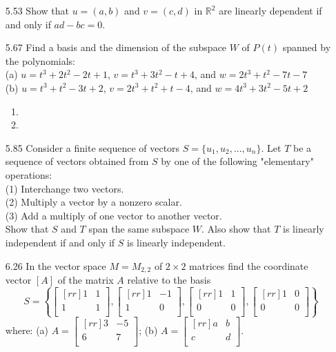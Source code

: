 \documentclass[12pt]{article}
\theoremstyle{definition}
\theoremstyle{plain}
\begin{document}
\begin{enumerate}
\begin{enumerate}
	\end{enumerate}
\item[5.53]Show that $u=(a,b)$ and $v=(c,d)$ in $\mathbb{R}^2$ are linearly dependent if and only if $ad-bc=0$.
\item[5.67]Find a basis and the dimension of the subspace $W$ of $P(t)$ spanned by the polynomials:\\
(a) $u=t^3+2t^2-2t+1$, $v=t^3+3t^2-t+4$, and $w=2t^3+t^2-7t-7$\\
(b) $u=t^3+t^2-3t+2$, $v=2t^3+t^2+t-4$, and $w=4t^3+3t^2-5t+2$
	\begin{enumerate}
	\item
	\item
	\end{enumerate}
\item[5.85]Consider a finite sequence of vectors $S=\{u_1,u_2,...,u_n\}$. Let $T$ be a sequence of vectors obtained from $S$ by one of the following "elementary" operations:\\
(1) Interchange two vectors.\\
(2) Multiply a vector by a nonzero scalar.\\
(3) Add a multiply of one vector to another vector.\\
Show that $S$ and $T$ span the same subspace $W$. Also show that $T$ is linearly independent if and only if $S$ is linearly independent.
\item[6.26]In the vector space $M=M_{2,2}$ of $2\times 2$ matrices find the coordinate vector $[A]$ of the matrix $A$ relative to the basis
\[ S=\left\{ \begin{bmatrix}[rr]1&1\\1&1\\\end{bmatrix},\begin{bmatrix}[rr]1&-1\\1&0\\\end{bmatrix},\begin{bmatrix}[rr]1&1\\0&0\\\end{bmatrix},\begin{bmatrix}[rr]1&0\\0&0\\\end{bmatrix}\right\} \]
where: (a) $A=\begin{bmatrix}[rr]3&-5\\6&7\\\end{bmatrix}$; (b) $A=\begin{bmatrix}[rr]a&b\\c&d\\\end{bmatrix}$.

\end{enumerate}
\end{document}
